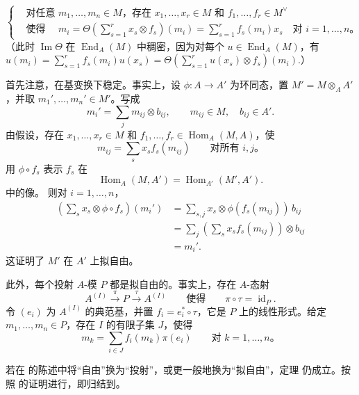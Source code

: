 \[
  \left\{
  \begin{aligned}
    &\text{对任意 \(m_1,\ldots,m_n\in M\)，存在
      \(x_1,\ldots,x_r\in M\) 和 \(f_1,\ldots,f_r\in M^\vee\)}\\
    &\text{使得 }\quad
    m_i
    =
    \Theta\!\left(\sum_{s=1}^r x_s\otimes f_s\right)(m_i)
    =
    \sum_{s=1}^r f_s(m_i)x_s
    \quad\text{对 \(i=1,\ldots,n\)。}
  \end{aligned}
  \right.
  \tag{*}\label{sga3:viii:remark:6:8:eq:star:01}
\]
\noindent（此时 \(\operatorname{Im}\Theta\) 在 \(\operatorname{End}_A(M)\) 中稠密，因为对每个 \(u\in\operatorname{End}_A(M)\)，有
\(
  u(m_i)
  =
  \sum_{s=1}^r f_s(m_i)u(x_s)
  =
  \Theta\!\left(\sum_{s=1}^r u(x_s)\otimes f_s\right)(m_i).
\)）

首先注意，在基变换下稳定。事实上，设 \(\phi:A\to A'\) 为环同态，置 \(M'=M\otimes_AA'\)，并取 \(m_1',\ldots,m_n'\in M'\)。写成
\[
  m_i'=\sum_jm_{ij}\otimes b_{ij},
  \qquad m_{ij}\in M,\quad b_{ij}\in A'.
\]
由假设，存在 \(x_1,\ldots,x_r\in M\) 和 \(f_1,\ldots,f_r\in\operatorname{Hom}_A(M,A)\)，使
\[
  m_{ij}=\sum_sx_sf_s(m_{ij})
  \qquad\text{对所有 \(i,j\)。}
\]
用 \(\phi\circ f_s\) 表示 \(f_s\) 在 \[
  \operatorname{Hom}_A(M,A')
  =
  \operatorname{Hom}_{A'}(M',A').
\] 中的像。
则对 \(i=1,\ldots,n\)，
\[
  \begin{aligned}
  \left(\sum_sx_s\otimes\phi\circ f_s\right)(m_i')
    &=
    \sum_{s,j}x_s\otimes\phi(f_s(m_{ij}))\,b_{ij}\\
    &=
    \sum_j\left(\sum_sx_sf_s(m_{ij})\right)\otimes b_{ij}\\
    &=m_i'.
  \end{aligned}
\]
这证明了 \(M'\) 在 \(A'\) 上拟自由。

此外，每个投射 \(A\)-模 \(P\) 都是拟自由的。事实上，存在 \(A\)-态射
\[
  A^{(I)}\xrightarrow{\ \pi\ }P
  \xrightarrow{\ \tau\ }A^{(I)}
  \qquad\text{使得}\qquad
  \pi\circ\tau=\operatorname{id}_P.
\]
令 \((e_i)\) 为 \(A^{(I)}\) 的典范基，并置 \(f_i=e_i^*\circ\tau\)，它是 \(P\) 上的线性形式。给定 \(m_1,\ldots,m_n\in P\)，存在 \(I\) 的有限子集 \(J\)，使得
\[
  m_k=\sum_{i\in J}f_i(m_k)\pi(e_i)
  \qquad\text{对 \(k=1,\ldots,n\)。}
\]

若在 的陈述中将“自由”换为“投射”，或更一般地换为“拟自由”，定理  仍成立。按照  的证明进行，即归结到。

